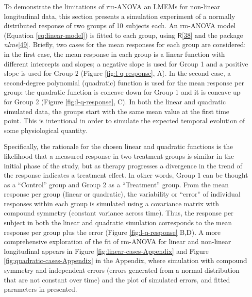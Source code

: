 \documentclass[
]{article}
\begin{document}
To demonstrate the limitations of rm-ANOVA an LMEMs for non-linear longitudinal data, this section presents a simulation experiment of a normally distributed response of two groups of 10 subjects each. An rm-ANOVA model (Equation \eqref{eq:linear-model}) is fitted to each group, using \(\textsf{R}\){[}\protect\hyperlink{ref-r}{38}{]} and the package \emph{nlme}{[}\protect\hyperlink{ref-nlme}{49}{]}.
Briefly, two cases for the mean responses for each group are considered: in the first case, the mean response in each group is a linear function with different intercepts and slopes; a negative slope is used for Group 1 and a positive slope is used for Group 2 (Figure \ref{fig:l-q-response}, A). In the second case, a second-degree polynomial (quadratic) function is used for the mean response per group: the quadratic function is concave down for Group 1 and it is concave up for Group 2 (Figure \ref{fig:l-q-response}, C). In both the linear and quadratic simulated data, the groups start with the same mean value at the first time point. This is intentional in order to simulate the expected temporal evolution of some physiological quantity.

Specifically, the rationale for the chosen linear and quadratic functions is the likelihood that a measured response in two treatment groups is similar in the initial phase of the study, but as therapy progresses a divergence in the trend of the response indicates a treatment effect. In other words, Group 1 can be thought as a ``Control'' group and Group 2 as a ``Treatment'' group. From the mean response per group (linear or quadratic), the variability or ``error'' of individual responses within each group is simulated using a covariance matrix with compound symmetry (constant variance across time). Thus, the response per subject in both the linear and quadratic simulation corresponds to the mean response per group plus the error (Figure \ref{fig:l-q-response} B,D). A more comprehensive exploration of the fit of rm-ANOVA for linear and non-linear longitudinal appears in Figure \ref{fig:linear-cases-Appendix} and Figure \ref{fig:quadratic-cases-Appendix} in the Appendix, where simulation with compound symmetry and independent errors (errors generated from a normal distribution that are not constant over time) and the plot of simulated errors, and fitted parameters in presented.
\end{document}
